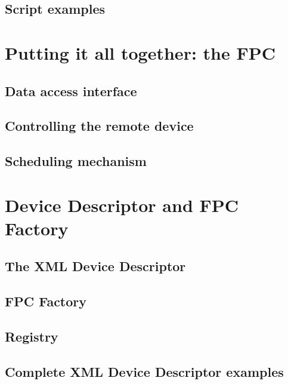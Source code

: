 \subsection{Script examples}


\section{Putting it all together: the FPC}

\subsection{Data access interface}

\subsection{Controlling the remote device}

\subsection{Scheduling mechanism}


\section{Device Descriptor and FPC Factory}

\subsection{The XML Device Descriptor}

\subsection{FPC Factory}

\subsection{Registry}

\subsection{Complete XML Device Descriptor examples}
